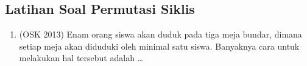 \subsection{Latihan Soal Permutasi Siklis}
\begin{enumerate}
    \item (OSK 2013) Enam orang siswa akan duduk pada tiga meja bundar, dimana setiap meja akan diduduki oleh minimal satu siswa. Banyaknya cara untuk melakukan hal tersebut adalah \ldots
\end{enumerate}